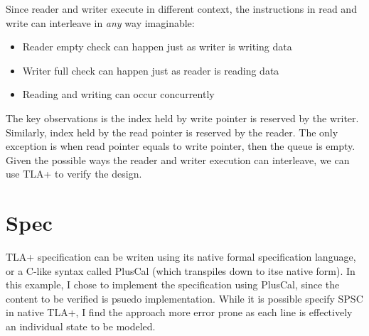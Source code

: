 Since reader and writer execute in different context, the instructions in read
and write can interleave in \textit{any} way imaginable:
\begin{itemize}
    \item Reader empty check can happen just as writer is writing data
    \item Writer full check can happen just as reader is reading data
    \item Reading and writing can occur concurrently
\end{itemize}

The key observations is the index held by write pointer is reserved by the
writer. Similarly, index held by the read pointer is reserved by the reader. The
only exception is when read pointer equals to write pointer, then the queue is
empty. Given the possible ways the reader and writer execution can interleave, 
we can use TLA+ to verify the design.

\section{Spec}

TLA+ specification can be writen using its native formal specification language,
or a C-like syntax called PlusCal (which transpiles down to itse native form).
In this example, I chose to implement the specification using PlusCal, since the
content to be verified is psuedo implementation. While it is possible specify
SPSC in native TLA+, I find the approach more error prone as each line is
effectively an individual state to be modeled.\newline

